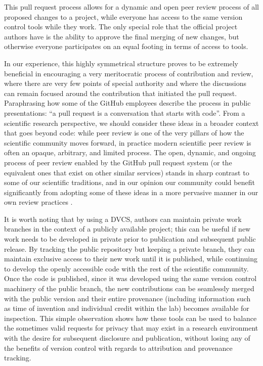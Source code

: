 \documentclass[ChapterTOCs,krantz2]{krantz} %
\theoremstyle{definition}
\begin{document}
This pull request process allows for a dynamic and open peer review process of
all proposed changes to a project, while everyone has access to the same
version control tools while they work.  The only special role that the official
project authors have is the ability to approve the final merging of new
changes, but otherwise everyone participates on an equal footing in terms of
access to tools.  

In our experience, this highly symmetrical structure proves to be extremely
beneficial in encouraging a very meritocratic process of contribution and
review, where there are very few points of special authority and where the
discussions can remain focused around the contribution that initiated the pull
request.  Paraphrasing how some of the GitHub employees describe the process in
public presentations: ``a pull request is a conversation that starts with
code''.  From a scientific research perspective, we should consider these ideas
in a broader context that goes beyond code: while peer review is one of the
very pillars of how the scientific community moves forward, in practice modern
scientific peer review is often an opaque, arbitrary, and limited process.  The
open, dynamic, and ongoing process of peer review enabled by the GitHub pull
request system (or the equivalent ones that exist on other similar services)
stands in sharp contrast to some of our scientific traditions, and in our
opinion our community could benefit significantly from adopting some of these
ideas in a more pervasive manner in our own review practices
\cite{10.3389/fncom.2012.00018}.

It is worth noting that by using a DVCS, authors can maintain private work
branches in the context of a publicly available project; this can be useful if
new work needs to be developed in private prior to publication and subsequent
public release. By tracking the public repository but keeping a private branch,
they can maintain exclusive access to their new work until it is published,
while continuing to develop the openly accessible code with the rest of the
scientific community. Once the code is published, since it was developed using
the same version control machinery of the public branch, the new contributions
can be seamlessly merged with the public version and their entire provenance
(including information such as time of invention and individual credit within
the lab) becomes available for inspection.  This simple observation shows how
these tools can be used to balance the sometimes valid requests for privacy
that may exist in a research environment with the desire for subsequent
disclosure and publication, without losing any of the benefits of version
control with regards to attribution and provenance tracking.
\end{document}
